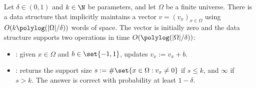 %
\begin{theorem}
    \label{thm:sparse-recovery}
    Let $\delta \in (0,1)$ and $k \in \N$ be parameters, and let $\Omega$ be a finite universe. There is a data structure that implicitly maintains a vector $v = (v_x)_{x \in \Omega}$ using $O(k \polylog (|\Omega|/\delta))$ words of space. The vector is initially zero and the data structure supports two operations in time $O(\polylog (|\Omega|/\delta))$:
    \begin{itemize}
        \item {}: given $x \in \Omega$ and $b \in \set{-1,1}$, updates $v_x := v_x + b$.
        \item \support{}: returns the support size $s := \#\set{x \in \Omega: v_x \neq 0}$ if $s \leq k$, and $\infty$ if $s > k$. The answer is correct with probability at least $1-\delta$. 
    \end{itemize}
\end{theorem}
%
